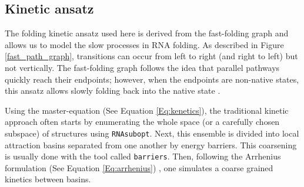 %	
%	
%	
%			
%				
%			
%

\subsection{Kinetic ansatz}
The folding kinetic ansatz used here is derived from the fast-folding graph and allows us to model the slow processes in RNA folding. As described in Figure \ref{fast_path_graph}, transitions can occur from left to right (and right to left) but not vertically. The fast-folding graph follows the idea that parallel pathways quickly reach their endpoints; however, when the endpoints are non-native states, this ansatz allows slowly folding back into the native state \cite{pan97_foldin_rna_invol_paral_pathw}. 

Using the master-equation (See Equation \ref{Eq:kenetics}), the traditional kinetic approach often starts by enumerating the whole space (or a carefully chosen subspace) of structures using \texttt{RNAsubopt}. Next, this ensemble is divided into local attraction basins separated from one another by energy barriers. This coarsening is usually done with the tool called \texttt{barriers}. Then, following the Arrhenius formulation (See Equation \ref{Eq:arrhenius}) , one simulates a coarse grained kinetics between basins.  

